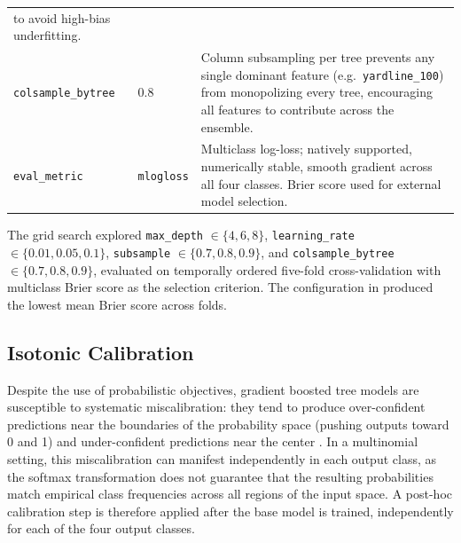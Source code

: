 \begin{table}[htbp]
\begin{tabularx}{\textwidth}{llX}
                                           to avoid high-bias underfitting. \\[4pt]
    \texttt{colsample\_bytree}   & 0.8   & Column subsampling per tree prevents any
                                           single dominant feature (e.g.\
                                           \texttt{yardline\_100}) from monopolizing
                                           every tree, encouraging all features to
                                           contribute across the ensemble. \\[4pt]
    \texttt{eval\_metric}        & \texttt{mlogloss}
                                         & Multiclass log-loss; natively supported,
                                           numerically stable, smooth gradient across
                                           all four classes. Brier score used for
                                           external model selection. \\
    \bottomrule
  \end{tabularx}
\end{table}

The grid search explored \texttt{max\_depth} $\in \{4, 6, 8\}$, \texttt{learning\_rate} $\in \{0.01, 0.05, 0.1\}$, \texttt{subsample} $\in \{0.7, 0.8, 0.9\}$, and \texttt{colsample\_bytree} $\in \{0.7, 0.8, 0.9\}$, evaluated on temporally ordered five-fold cross-validation with multiclass Brier score as the selection criterion. The configuration in  produced the lowest mean Brier score across folds.

\subsection{Isotonic Calibration}
\label{sec:calibration}

Despite the use of probabilistic objectives, gradient boosted tree models
are susceptible to systematic miscalibration: they tend to produce
over-confident predictions near the boundaries of the probability space
(pushing outputs toward 0 and 1) and under-confident predictions near the
center \parencite{niculescumizil2005probabilities}. In a multinomial setting,
this miscalibration can manifest independently in each output class, as the
softmax transformation does not guarantee that the resulting probabilities
match empirical class frequencies across all regions of the input space.
A post-hoc calibration step is therefore applied after the base model is
trained, independently for each of the four output classes.

